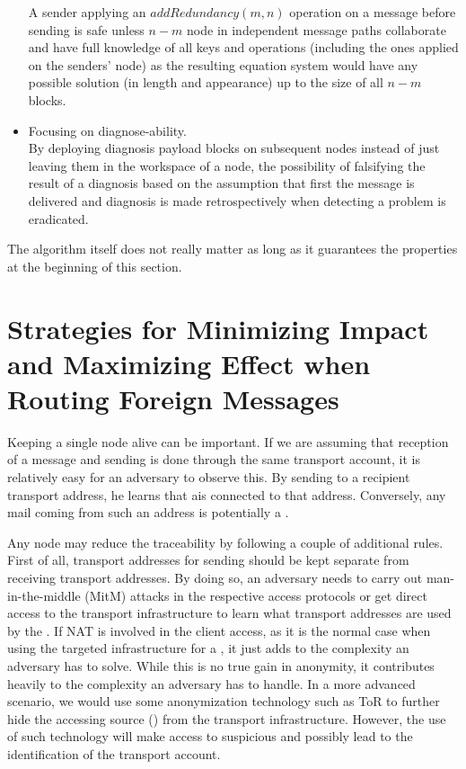 \begin{itemize}
	      A sender applying an $addRedundancy(m,n)$ operation on a message before sending is safe unless $n-m$ node in independent message paths collaborate and have full knowledge of all keys and operations (including the ones applied on the senders' node) as the resulting equation system would have any possible solution (in length and appearance) up to the size of all $n-m$ blocks.
	\item Focusing on diagnose-ability.\\
	      By deploying diagnosis payload blocks on subsequent nodes instead of just leaving them in the workspace of a node, the possibility of falsifying the result of a diagnosis based on the assumption that first the message is delivered and diagnosis is made retrospectively when detecting a problem is eradicated.
\end{itemize}

The algorithm itself does not really matter as long as it guarantees the properties at the beginning of this section.

\section{Strategies for Minimizing Impact and Maximizing Effect when Routing Foreign Messages}
Keeping a single node alive can be important. If we are assuming that reception of a message and sending is done through the same transport account, it is relatively easy for an adversary to observe this. By sending to a recipient transport address, he learns that a\VortexNode is connected to that address. Conversely, any mail coming from such an address is potentially a \VortexMessage{}.

Any node may reduce the traceability by following a couple of additional rules. First of all, transport addresses for sending should be kept separate from receiving transport addresses. By doing so, an adversary needs to carry out man-in-the-middle (MitM) attacks in the respective access protocols or get direct access to the transport infrastructure to learn what transport addresses are used by the \VortexNode{}. If NAT is involved in the client access, as it is the normal case when using the targeted infrastructure for a \VortexNode, it just adds to the complexity an adversary has to solve. While this is no true gain in anonymity, it contributes heavily to the complexity an adversary has to handle. In a more advanced scenario, we would use some anonymization technology such as ToR to further hide the accessing source (\VortexNode) from the transport infrastructure. However, the use of such technology will make access to suspicious and possibly lead to the identification of the transport account.

